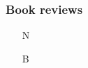 \documentclass[11pt,letterpaper,oneside]{article}
\begin{document}



\setcounter{subsubsection}{214}
\subsubsection{Book reviews}
\label{14.215}

\begin{itemize}
\item[N] 

\item[B] 
\end{itemize}





\end{document}
